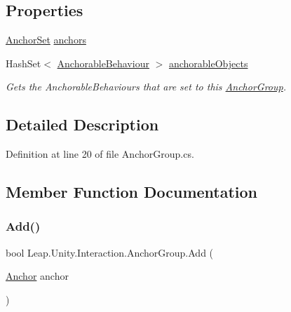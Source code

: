 \subsection*{Properties}
\begin{DoxyCompactItemize}
\item 
\mbox{\hyperlink{class_leap_1_1_unity_1_1_interaction_1_1_anchor_set}{Anchor\+Set}} \mbox{\hyperlink{class_leap_1_1_unity_1_1_interaction_1_1_anchor_group_a57bbc5ec4573e3c75a1716fa4650020c}{anchors}}
\item 
Hash\+Set$<$ \mbox{\hyperlink{class_leap_1_1_unity_1_1_interaction_1_1_anchorable_behaviour}{Anchorable\+Behaviour}} $>$ \mbox{\hyperlink{class_leap_1_1_unity_1_1_interaction_1_1_anchor_group_aa61e68ce4002195f34a57d79fb96e48e}{anchorable\+Objects}}
\begin{DoxyCompactList}\small\item\em Gets the Anchorable\+Behaviours that are set to this \mbox{\hyperlink{class_leap_1_1_unity_1_1_interaction_1_1_anchor_group}{Anchor\+Group}}. \end{DoxyCompactList}\end{DoxyCompactItemize}


\subsection{Detailed Description}


Definition at line 20 of file Anchor\+Group.\+cs.



\subsection{Member Function Documentation}
\mbox{\label{class_leap_1_1_unity_1_1_interaction_1_1_anchor_group_a83cf6387f2a3c2602086d4aeec301119}} 
\subsubsection{\texorpdfstring{Add()}{Add()}}
{\footnotesize\ttfamily bool Leap.\+Unity.\+Interaction.\+Anchor\+Group.\+Add (\begin{DoxyParamCaption}\item[{\mbox{\hyperlink{class_leap_1_1_unity_1_1_interaction_1_1_anchor}{Anchor}}}]{anchor }\end{DoxyParamCaption})}



